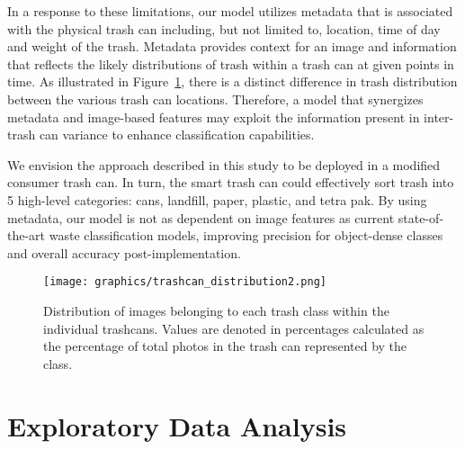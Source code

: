 \documentclass[conference]{ieeeconf}
\begin{document}
In a response to these limitations, our model utilizes metadata that is associated with the physical trash can including, but not limited to, location, time of day and weight of the trash. Metadata provides context for an image and information that reflects the likely distributions of trash within a trash can at given points in time. As illustrated in Figure~\ref{fig:trashcandist}, there is a distinct difference in trash distribution between the various trash can locations. Therefore, a model that synergizes metadata and image-based features may exploit the information present in inter-trash can variance to enhance classification capabilities. 

We envision the approach described in this study to be deployed in a modified consumer trash can. In turn, the smart trash can could effectively sort trash into 5 high-level categories: cans, landfill, paper, plastic, and tetra pak. By using metadata, our model is not as dependent on image features as current state-of-the-art waste classification models, improving precision for object-dense classes and overall accuracy post-implementation. 

\begin{figure}
\centering
  \texttt{[image: graphics/trashcan\_distribution2.png]}
  \caption{Distribution of images belonging to each trash class within the individual trashcans. Values are denoted in percentages calculated as the percentage of total photos in the trash can represented by the class.}
  \label{fig:trashcandist}
\end{figure}



\section{Exploratory Data Analysis}

\end{document}
